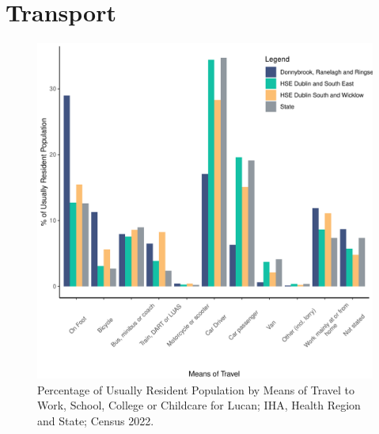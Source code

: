 \documentclass{article}
\begin{document}
\section{Transport}\label{sect:Trans}
\begin{figure}[H]
	\centering
	\includegraphics[width = 120mm]{../figures/TravelED.pdf}
	\caption{Percentage of Usually Resident Population by Means of Travel to Work, School, College or Childcare for Lucan; IHA, Health Region and State; Census 2022.}
	\label{fig:vbnv}
	\end{figure}
\end{document}
